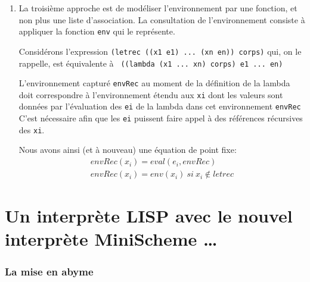 \documentclass[11pt]{book}
\begin{document}
\begin{enumerate}
\begin{Verbatim}
 (define fact (Y F*))
\end{Verbatim}
  
  \item La troisième approche est de modéliser l'environnement par une fonction, et non plus une liste d'association.
  La consultation de l'environnement consiste \`{a} appliquer la fonction \verb+env+ qui le repr\'{e}sente.

  Considérons l'expression \verb+(letrec ((x1 e1) ... (xn en)) corps)+  qui, on le rappelle, est \'{e}quivalente à 
  \verb+ ((lambda (x1 ... xn) corps) e1 ... en)+
  
  L'environnement capturé \verb+envRec+ au moment de la définition de la lambda  doit correspondre à 
  l'environnement étendu aux \verb+xi+ dont les valeurs sont données par l'évaluation des \verb+ei+ de la lambda 
  dans cet environnement \verb+envRec+
  C'est nécessaire afin que les \verb+ei+ puissent faire appel à des références récursives des \verb+xi+.
  
  Nous avons ainsi (et à nouveau) une équation de point fixe:
\[
  \begin{array}{l}
    envRec(x_i) = eval (e_i, envRec) \\
    envRec(x_i) = env (x_i) \ si \ x_i \notin letrec
  \end{array}
\]
  
\end{enumerate}

\section{Un interprète LISP avec le nouvel interprète MiniScheme \ldots}
\subsubsection{La mise en abyme}
\end{document}
